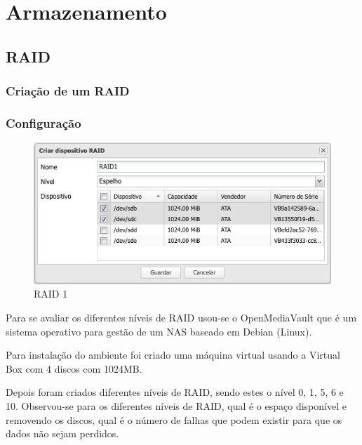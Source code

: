 \documentclass[pdftex,12pt,a4paper]{report}
\begin{document}
\section{Armazenamento}

\subsection{RAID}

\subsubsection{Criação de um RAID}

\subsubsection{Configuração}

\begin{figure}[!htb]
\center
 \includegraphics[width=150mm,scale=1]{imagens/RAID1Create.png}
 \caption{RAID 1}
 \label{fig:exemploraid}
\end{figure}

Para se avaliar os diferentes níveis de RAID usou-se o OpenMediaVault que é um sistema operativo para gestão de um NAS baseado em Debian (Linux).

Para instalação do ambiente foi criado uma máquina virtual usando a Virtual Box com 4 discos com 1024MB.

Depois foram criados diferentes níveis de RAID, sendo estes o nível 0, 1, 5, 6 e 10. Observou-se para os diferentes níveis de RAID, qual é o espaço disponível e removendo os discos, qual é o número de falhas que podem existir para que os dados não sejam perdidos. 
\end{document}
